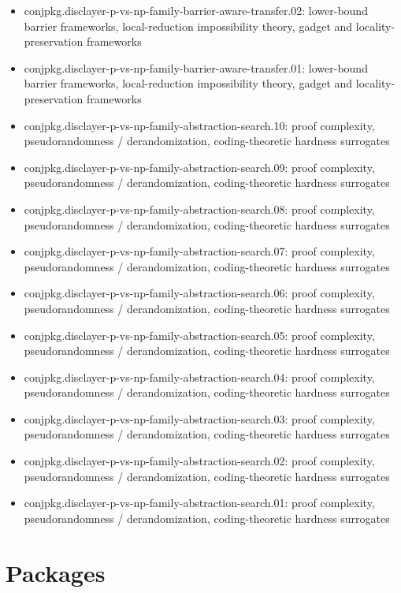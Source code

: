 \documentclass[11pt]{article}
\begin{document}
\begin{itemize}
\item conjpkg.disclayer-p-vs-np-family-barrier-aware-transfer.02: lower-bound barrier frameworks, local-reduction impossibility theory, gadget and locality-preservation frameworks
\item conjpkg.disclayer-p-vs-np-family-barrier-aware-transfer.01: lower-bound barrier frameworks, local-reduction impossibility theory, gadget and locality-preservation frameworks
\item conjpkg.disclayer-p-vs-np-family-abstraction-search.10: proof complexity, pseudorandomness / derandomization, coding-theoretic hardness surrogates
\item conjpkg.disclayer-p-vs-np-family-abstraction-search.09: proof complexity, pseudorandomness / derandomization, coding-theoretic hardness surrogates
\item conjpkg.disclayer-p-vs-np-family-abstraction-search.08: proof complexity, pseudorandomness / derandomization, coding-theoretic hardness surrogates
\item conjpkg.disclayer-p-vs-np-family-abstraction-search.07: proof complexity, pseudorandomness / derandomization, coding-theoretic hardness surrogates
\item conjpkg.disclayer-p-vs-np-family-abstraction-search.06: proof complexity, pseudorandomness / derandomization, coding-theoretic hardness surrogates
\item conjpkg.disclayer-p-vs-np-family-abstraction-search.05: proof complexity, pseudorandomness / derandomization, coding-theoretic hardness surrogates
\item conjpkg.disclayer-p-vs-np-family-abstraction-search.04: proof complexity, pseudorandomness / derandomization, coding-theoretic hardness surrogates
\item conjpkg.disclayer-p-vs-np-family-abstraction-search.03: proof complexity, pseudorandomness / derandomization, coding-theoretic hardness surrogates
\item conjpkg.disclayer-p-vs-np-family-abstraction-search.02: proof complexity, pseudorandomness / derandomization, coding-theoretic hardness surrogates
\item conjpkg.disclayer-p-vs-np-family-abstraction-search.01: proof complexity, pseudorandomness / derandomization, coding-theoretic hardness surrogates
\end{itemize}

\section*{Packages}
\end{document}
